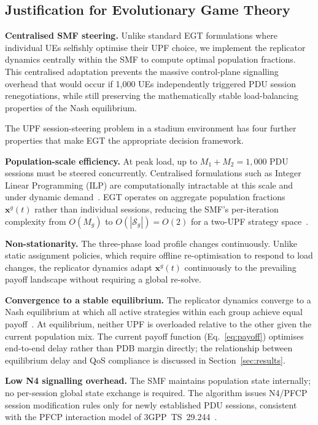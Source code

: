 \documentclass[conference]{IEEEtran}
\begin{document}
\subsection{Justification for Evolutionary Game Theory}
\label{sec:egt_justify}

\textbf{Centralised SMF steering.}
Unlike standard EGT formulations where individual UEs selfishly
optimise their UPF choice, we implement the replicator dynamics
centrally within the SMF to compute optimal population fractions.
This centralised adaptation prevents the massive control-plane
signalling overhead that would occur if 1,000 UEs independently
triggered PDU session renegotiations, while still preserving
the mathematically stable load-balancing properties of the
Nash equilibrium.

The UPF session-steering problem in a stadium environment
has four further properties that make EGT the appropriate
decision framework.

\textbf{Population-scale efficiency.} At peak
load, up to $M_1 + M_2 = 1{,}000$ PDU sessions must be
steered concurrently. Centralised formulations such as
Integer Linear Programming (ILP) are computationally
intractable at this scale and under dynamic
demand~\cite{LeyvaUPC2023}. EGT operates on aggregate
population fractions $\mathbf{x}^g(t)$ rather than
individual sessions, reducing the SMF's per-iteration
complexity from $O(M_g)$ to $O(|\mathcal{S}_g|) = O(2)$
for a two-UPF strategy space~\cite{Alevizaki2021upf}.

\textbf{Non-stationarity.} The three-phase load profile
changes continuously. Unlike static assignment policies,
which require offline re-optimisation to respond to load
changes, the replicator dynamics adapt $\mathbf{x}^g(t)$
continuously to the prevailing payoff landscape without
requiring a global re-solve.

\textbf{Convergence to a stable equilibrium.} The
replicator dynamics converge to a Nash equilibrium at
which all active strategies within each group achieve
equal payoff~\cite{Alevizaki2021upf}. At equilibrium,
neither UPF is overloaded relative to the other given
the current population mix. The current payoff function
(Eq.~\eqref{eq:payoff}) optimises end-to-end delay
rather than PDB margin directly; the relationship between
equilibrium delay and QoS compliance is discussed in
Section~\ref{sec:results}.

\textbf{Low N4 signalling overhead.} The SMF maintains
population state internally; no per-session global state
exchange is required. The algorithm issues N4/PFCP
session modification rules only for newly established
PDU sessions, consistent with the PFCP interaction model
of 3GPP~TS~29.244~\cite{3gpp_ts29244}.
\end{document}
